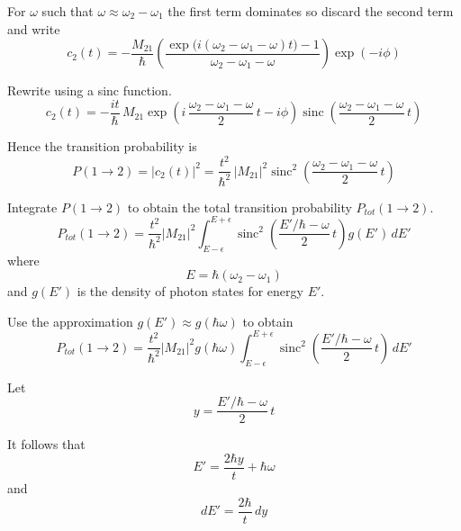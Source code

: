 For $\omega$ such that $\omega\approx\omega_2-\omega_1$ the first term
dominates so discard the second term and write
\begin{equation*}
c_2(t)=-\frac{M_{21}}{\hbar}
\left(
\frac{\exp\bigl(i(\omega_2-\omega_1-\omega) t\bigr)-1}{\omega_2-\omega_1-\omega}
\right)\exp(-i\phi)
\end{equation*}

Rewrite using a sinc function.
\begin{equation*}
c_2(t)=-\frac{it}{\hbar}\,M_{21}
\exp\left(i\,\frac{\omega_2-\omega_1-\omega}{2}\,t-i\phi\right)
\operatorname{sinc}\left(\frac{\omega_2-\omega_1-\omega}{2}\,t\right)
\tag{2}
\end{equation*}

Hence the transition probability is
\begin{equation*}
P(1\rightarrow2)=|c_2(t)|^2=\frac{t^2}{\hbar^2}\,|M_{21}|^2
\operatorname{sinc}^2\left(\frac{\omega_2-\omega_1-\omega}{2}\,t\right)
\tag{3}
\end{equation*}

Integrate $P(1\rightarrow2)$ to obtain the total transition probability
$P_{tot}(1\rightarrow2)$.
\begin{equation*}
P_{tot}(1\rightarrow2)=\frac{t^2}{\hbar^2}|M_{21}|^2
\int_{E-\epsilon}^{E+\epsilon}
\operatorname{sinc}^2\left(\frac{E'/\hbar-\omega}{2}\,t\right)
g(E')\,dE'
\end{equation*}
%
where
\begin{equation*}
E=\hbar(\omega_2-\omega_1)
\end{equation*}
%
and $g(E')$ is the density of photon states for energy $E'$.

\bigskip

Use the approximation $g(E')\approx g(\hbar\omega)$ to obtain
\begin{equation*}
P_{tot}(1\rightarrow2)=\frac{t^2}{\hbar^2}|M_{21}|^2g(\hbar\omega)
\int_{E-\epsilon}^{E+\epsilon}
\operatorname{sinc}^2\left(\frac{E'/\hbar-\omega}{2}\,t\right)\,dE'
\end{equation*}

Let
\begin{equation*}
y=\frac{E'/\hbar-\omega}{2}\,t
\end{equation*}

It follows that
\begin{equation*}
E'=\frac{2\hbar y}{t}+\hbar\omega
\end{equation*}
%
and
\begin{equation*}
dE'=\frac{2\hbar}{t}\,dy
\end{equation*}

